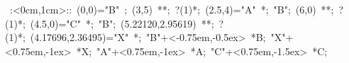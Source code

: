 
\hbox{
\xy    <1cm,0cm>:<0cm,1cm>::
       (0,0)="B" ; (3,5) **\dir{-};  ?(1)*\dir{>}; (2.5,4)="A" *{\bullet};
       "B"; (6,0) **\dir{-};  ?(1)*\dir{>}; (4.5,0)="C" *{\bullet};
       "B"; (5.22120,2.95619) **\dir{-};  ?(1)*\dir{>}; (4.17696,2.36495)="X" *{\bullet};
       "B"+<-0.75em,-0.5ex> *{B};
       "X"+<0.75em,-1ex> *{X};
       "A"+<0.75em,-1ex> *{A};
       "C"+<0.75em,-1.5ex> *{C};
       \endxy}
	   
